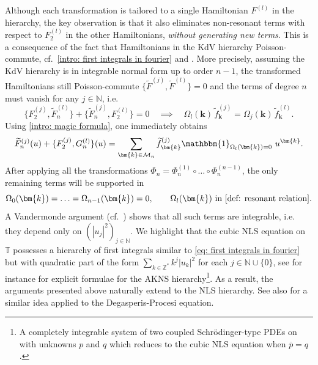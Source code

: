 \documentclass[a4paper,10pt,reqno]{article}
\theoremstyle{definition}
\theoremstyle{plain}
\theoremstyle{plain}
\theoremstyle{definition}
\theoremstyle{plain}
\theoremstyle{plain}
\theoremstyle{plain}
\theoremstyle{definition}
\theoremstyle{definition}
\def \N{\mathbb N}
\def \Z{\mathbb Z}
\def \T{\mathbb{T}}
\def \M{\mathcal{M}}
\def \k{\bm{k}}
\begin{document}
Although each transformation is tailored to a single Hamiltonian $F^{(l)}$ in the hierarchy, the key observation is that it also eliminates non-resonant terms with respect to $F^{(l)}_2$ in the other Hamiltonians, \emph{without generating new terms}. This is a consequence of the fact that Hamiltonians in the KdV hierarchy Poisson-commute, cf.~\eqref{intro: first integrals in fourier} and \cite[Theorem~G.2]{kappeler}. 
More precisely, assuming the KdV hierarchy is in integrable normal form up to order $n-1$, the transformed Hamiltonians still Poisson-commute $\{\tilde{F}^{(j)},\tilde{F}^{(l)}\}=0$ and the terms of degree $n$ must vanish for any $j\in\N$, i.e.
\begin{equation} \label{intro: magic formula}
\{ F_2^{(j)} , \widetilde{F}_n^{(l)} \} + \{ \widetilde{F}_n^{(j)} , F_2^{(l)} \} = 0 \quad \implies \quad \Omega_{l}(\k)\, \widetilde{f}_{\k}^{(j)} =  \Omega_{j}(\k) \,\widetilde{f}_{\k}^{(l)}.
\end{equation}
Using \eqref{intro: magic formula}, one immediately obtains
\begin{equation} \label{intro:hom_eq2}
    \widetilde{F}_n^{(j)}(u) + \{ F_2^{(j)} , G_n^{(l)} \}(u) = \sum_{\k \in \M_n} \widetilde{f}_{\k}^{(j)} \mathbbm{1}_{\Omega_{l}(\k) = 0} \ u^{\k}.
\end{equation}
After applying all the transformations $\Phi_n=\Phi_n^{(1)} \circ \ldots \circ \Phi_n^{(n-1)}$, the only remaining terms will be supported in 
\begin{equation}
    \Omega_{0}(\k) = \ldots = \Omega_{n-1}(\k) =0, \qquad \Omega_{l}(\k)\ \mbox{in \eqref{def: resonant relation}}.
\end{equation}  
A Vandermonde argument (cf.~) shows that all such terms are integrable, i.e. they depend only on $(|u_j|^2)_{j\in\N}$. We highlight that the cubic NLS equation on $\T$ possesses a hierarchy of first integrals similar to \eqref{eq: first integrals in fourier} but with quadratic part of the form $\sum_{k\in\Z^{*}} k^{j} |u_k|^2$ for each $j\in\N\cup \{0\}$, see for instance \cite[Chapter 3]{akns} for explicit formulae for the AKNS hierarchy\footnote{A completely integrable system of two coupled Schr\"odinger-type PDEs on with unknowns $p$ and $q$ which reduces to the cubic NLS equation when $\overline{p}=q$.}. As a result, the arguments presented above naturally extend to the NLS hierarchy. See also \cite{feola,feola2} for a similar idea applied to the Degasperis-Procesi equation.
\end{document}
